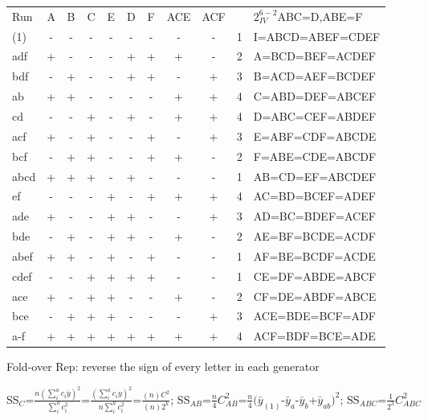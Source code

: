 \documentclass[
  10pt,
  twocolumn]{article}
\begin{document}
\begin{tabular}{ |l|c|c|c|c|c|c|c|c|c|l }
 Run & A& B & C & E & D & F &{\tiny ACE}&{\tiny ACF}&&$2^{6-2}_{IV}$ABC=D,ABE=F\\
 (1) &- & - & - & - & - & - & -   & - & 1 &{\scriptsize I=ABCD=ABEF=CDEF}\\
 adf &+ & - & - & - & + & + & +   & - & 2 &{\scriptsize A=BCD=BEF=ACDEF}\\
 bdf &- & + & - & - & + & + & -   & + & 3 &{\scriptsize B=ACD=AEF=BCDEF}\\
 ab  &+ & + & - & - & - & - & +   & + & 4 &{\scriptsize C=ABD=DEF=ABCEF}\\
 cd  &- & - & + & - & + & - & +   & + & 4 &{\scriptsize D=ABC=CEF=ABDEF}\\
 acf &+ & - & + & - & - & + & -   & + & 3 &{\scriptsize E=ABF=CDF=ABCDE}\\
 bcf &- & + & + & - & - & + & +   & - & 2 &{\scriptsize F=ABE=CDE=ABCDF}\\
 abcd&+ & + & + & - & + & - & -   & - & 1 &{\scriptsize AB=CD=EF=ABCDEF}\\
 ef  &- & - & - & + & - & + & +   & + & 4 &{\scriptsize AC=BD=BCEF=ADEF}\\
 ade &+ & - & - & + & + & - & -   & + & 3 &{\scriptsize AD=BC=BDEF=ACEF}\\
 bde &- & + & - & + & + & - & +   & - & 2 &{\scriptsize AE=BF=BCDE=ACDF}\\
 abef&+ & + & - & + & - & + & -   & - & 1 &{\scriptsize AF=BE=BCDF=ACDE}\\
 cdef&- & - & + & + & + & + & -   & - & 1 &{\scriptsize CE=DF=ABDE=ABCF}\\
 ace &+ & - & + & + & - & - & +   & - & 2 &{\scriptsize CF=DE=ABDF=ABCE}\\
 bce &- & + & + & + & - & - & -   & + & 3 &{\scriptsize ACE=BDE=BCF=ADF}\\
 a-f &+ & + & + & + & + & + & +   & + & 4 &{\scriptsize ACF=BDF=BCE=ADE}
\end{tabular}

Fold-over Rep: reverse the sign of every letter in each generator

SS\(_C\)=\(\frac{n(\sum_{i}^ac_i\bar y)^2}{\sum_{i}^ac_i^2}\)=\(\frac{(\sum_{i}^ac_i y)^2}{n\sum_{i}^ac_i^2}\)=\(\frac{(n)C^2}{(n)2^k}\);
SS\(_{AB}\)=\(\frac{n}4C_{AB}^2\)=\(\frac{n}4(\bar y_{(1)}\)-\(\bar y_a\)-\(\bar y_b\)+\(\bar y_{ab})^2\);
SS\(_{ABC}\)=\(\frac1{2^3}C_{ABC}^2\)

\dotfill
\end{document}
